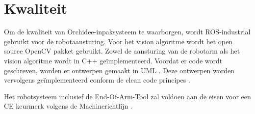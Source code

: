 \section{Kwaliteit}

Om de kwaliteit van Orchidee-inpaksysteem te waarborgen, wordt ROS-industrial gebruikt voor de robotaansturing.
Voor het vision algoritme wordt het open source OpenCV pakket gebruikt.
Zowel de aansturing van de robotarm als het vision algoritme wordt in C++ geïmplementeerd.
Voordat er code wordt geschreven, worden er ontwerpen gemaakt in UML \cite{UML}.
Deze ontwerpen worden vervolgens geïmplementeerd conform de clean code principes \cite{CLEAN_CODE}.

Het robotsysteem inclusief de End-Of-Arm-Tool zal voldoen aan de eisen voor een CE keurmerk volgens de Machinerichtlijn \cite{Machinerichtlijn}.

\newpage